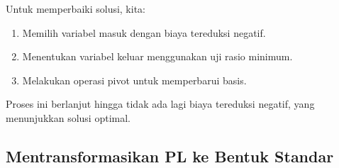 Untuk memperbaiki solusi, kita:
\begin{enumerate}
    \item Memilih variabel masuk dengan biaya tereduksi negatif.
    \item Menentukan variabel keluar menggunakan uji rasio minimum.
    \item Melakukan operasi pivot untuk memperbarui basis.
\end{enumerate}

Proses ini berlanjut hingga tidak ada lagi biaya tereduksi negatif, yang menunjukkan solusi optimal.

\subsection{Mentransformasikan PL ke Bentuk Standar}

